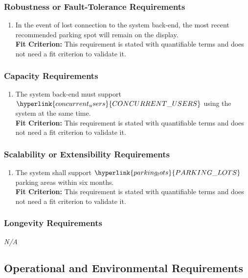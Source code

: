 \documentclass[12pt,letterpaper]{article}
\begin{document}
\subsubsection{Robustness or Fault-Tolerance Requirements}
\begin{enumerate}[resume*] 
    \item In the event of lost connection to the system back-end, the most recent recommended parking spot will remain on the display.\\
    \textbf{Fit Criterion:} This requirement is stated with quantifiable terms and does not need a fit criterion to validate it. 
\end{enumerate}

\subsubsection{Capacity Requirements}
\begin{enumerate}[resume*] 
    \item The system back-end must support $\hyperlink{concurrent_users}{CONCURRENT\_USERS}$ using the system at the same time.\\
    \textbf{Fit Criterion:} This requirement is stated with quantifiable terms and does not need a fit criterion to validate it. 
\end{enumerate}

\subsubsection{Scalability or Extensibility Requirements}
\begin{enumerate}[resume*] 
    \item The system shall support $\hyperlink{parking_lots}{PARKING\_LOTS}$ parking areas within six months.\\
    \textbf{Fit Criterion:} This requirement is stated with quantifiable terms and does not need a fit criterion to validate it. 
\end{enumerate}

\subsubsection{Longevity Requirements}
\noindent \emph{N/A}

\subsection{Operational and Environmental Requirements}
\end{document}
